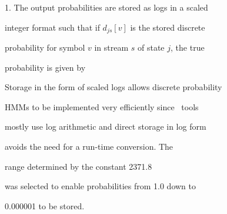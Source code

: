 1.  The output probabilities are stored as logs in a scaled




integer format such that if $d_{js}[v]$ is the stored  discrete


probability  for symbol $v$ in stream $s$ of state $j$, the true


probability is given by




Storage in the form of scaled logs allows discrete probability


HMMs to be implemented very efficiently since \HTK\ tools


mostly use log arithmetic  and direct storage in log form


avoids the need for a run-time conversion.  The


range determined by the constant 2371.8 


was selected to enable probabilities from 1.0 down to


0.000001 to be stored.













